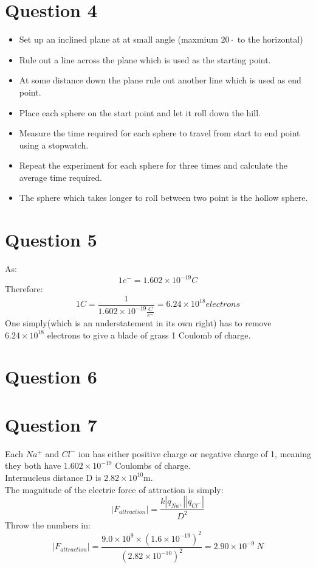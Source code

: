 \documentclass[10pt]{article}
\begin{document}
\section{Question 4}
\begin{itemize}
\item Set up an inclined plane at at small angle (maxmium $20 \cdot$ to the horizontal)
\item Rule out a line across the plane which is used as the starting point.
\item At some distance down the plane rule out another line which is used as end point.
\item Place each sphere on the start point and let it roll down the hill.
\item Measure the time required for each sphere to travel from start to end point using a stopwatch.
\item Repeat the experiment for each sphere for three times and calculate the average time required.
\item The sphere which takes longer to roll between two point is the hollow sphere.
\end{itemize}

\section{Question 5}
As:
\begin{displaymath}
1 e^{-} = 1.602 \times 10^{-19} C
\end{displaymath}
Therefore:
\begin{displaymath}
1 C = \frac{1}{1.602 \times 10^{-19} \frac{C}{e^{-}}}= 6.24 \times 10^{18} electrons
\end{displaymath}
One simply(which is an understatement in its own right) has to remove $6.24 \times 10^{18}$ electrons to give a blade of grass 1 Coulomb of charge. 

\pagebreak
\section{Question 6}
\pagebreak
\section{Question 7}
Each $Na^+$ and $Cl^{-}$ ion has either positive charge or negative charge of 1, meaning they both have
$1.602\times10^{-19}$ Coulombs of charge. \\ 
Internucleus distance D is $2.82 \times 10^{10}$m. \\
The magnitude of the electric force of attraction is simply:
\begin{displaymath}
|F_{attraction}|=\frac{k|q_{Na^+}||q_{Cl^-}|}{D^2}
\end{displaymath}
Throw the numbers in:
\begin{displaymath}
|F_{attraction}|=\frac{9.0 \times 10^9 \times(1.6 \times 10^{-19})^2 }{(2.82 \times 10^{-10})^2}=2.90\times 10^{-9} \ N 
\end{displaymath}
\end{document}
